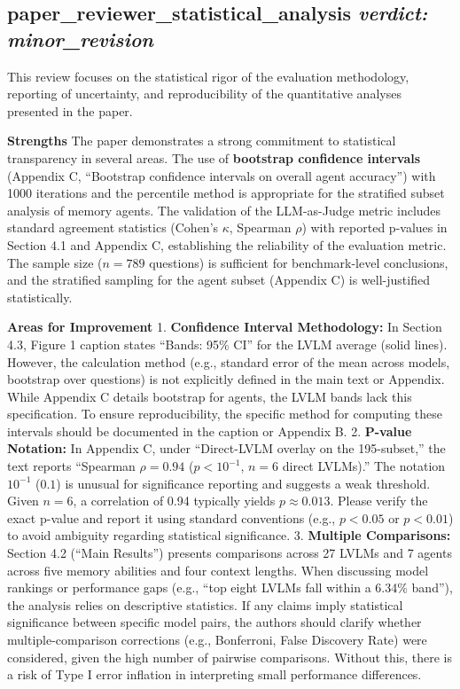 \documentclass{llmxive}
\begin{document}
\bigskip

\subsection*{paper\_reviewer\_statistical\_analysis \hfill \textit{verdict: minor\_revision}}
This review focuses on the statistical rigor of the evaluation methodology, reporting of uncertainty, and reproducibility of the quantitative analyses presented in the paper.

\textbf{Strengths}
The paper demonstrates a strong commitment to statistical transparency in several areas. The use of \textbf{bootstrap confidence intervals} (Appendix C, ``Bootstrap confidence intervals on overall agent accuracy'') with 1000 iterations and the percentile method is appropriate for the stratified subset analysis of memory agents. The validation of the LLM-as-Judge metric includes standard agreement statistics (Cohen's $\kappa$, Spearman $\rho$) with reported p-values in Section 4.1 and Appendix C, establishing the reliability of the evaluation metric. The sample size ($n=789$ questions) is sufficient for benchmark-level conclusions, and the stratified sampling for the agent subset (Appendix C) is well-justified statistically.

\textbf{Areas for Improvement}
1.  \textbf{Confidence Interval Methodology:} In Section 4.3, Figure 1 caption states ``Bands: 95\% CI'' for the LVLM average (solid lines). However, the calculation method (e.g., standard error of the mean across models, bootstrap over questions) is not explicitly defined in the main text or Appendix. While Appendix C details bootstrap for agents, the LVLM bands lack this specification. To ensure reproducibility, the specific method for computing these intervals should be documented in the caption or Appendix B.
2.  \textbf{P-value Notation:} In Appendix C, under ``Direct-LVLM overlay on the 195-subset,'' the text reports ``Spearman $\rho = 0.94$ ($p < 10^{-1}$, $n = 6$ direct LVLMs).'' The notation $10^{-1}$ ($0.1$) is unusual for significance reporting and suggests a weak threshold. Given $n=6$, a correlation of 0.94 typically yields $p \approx 0.013$. Please verify the exact p-value and report it using standard conventions (e.g., $p < 0.05$ or $p < 0.01$) to avoid ambiguity regarding statistical significance.
3.  \textbf{Multiple Comparisons:} Section 4.2 (``Main Results'') presents comparisons across 27 LVLMs and 7 agents across five memory abilities and four context lengths. When discussing model rankings or performance gaps (e.g., ``top eight LVLMs fall within a 6.34\% band''), the analysis relies on descriptive statistics. If any claims imply statistical significance between specific model pairs, the authors should clarify whether multiple-comparison corrections (e.g., Bonferroni, False Discovery Rate) were considered, given the high number of pairwise comparisons. Without this, there is a risk of Type I error inflation in interpreting small performance differences.
\end{document}
